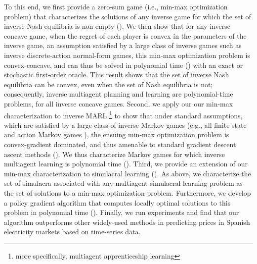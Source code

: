 
To this end, we first provide a zero-sum game (i.e., min-max optimization problem) that characterizes the solutions of any inverse game for which the set of inverse Nash equilibria is non-empty ().
We then show that for any inverse concave game, when the regret of each player is convex in the parameters of the inverse game, an assumption satisfied by a large class of inverse games such as inverse discrete-action normal-form games, this min-max optimization problem is convex-concave, and can thus be solved in polynomial time () with an exact or stochastic first-order oracle.
This result shows that the set of inverse Nash equilibria can be convex, even when the set of Nash equilibria is not; consequently, inverse multiagent planning and learning are polynomial-time problems, for all inverse concave games.
%
Second, we apply our our min-max characterization to inverse MARL%
\footnote{more specifically, multiagent apprenticeship learning} to show that under standard assumptions, which are satisfied by a large class of inverse Markov games (e.g., all finite state and action Markov games ), the ensuing min-max optimization problem is convex-gradient dominated, and thus amenable to standard gradient descent ascent methods  ().
We thus characterize Markov games for which inverse multiagent learning 
is polynomial time (). 
%
Third, we provide an extension of our min-max characterization to simulacral learning ().
As above, we characterize the set of simulacra associated with any multiagent simulacral learning problem as the set of solutions to a min-max optimization problem.
Furthermore, we develop a policy gradient algorithm that computes locally optimal  solutions to this problem in polynomial time ().
Finally, we run experiments and find that our algorithm outperforms other widely-used methods  in predicting prices in Spanish electricity markets based on time-series data.
\fi

